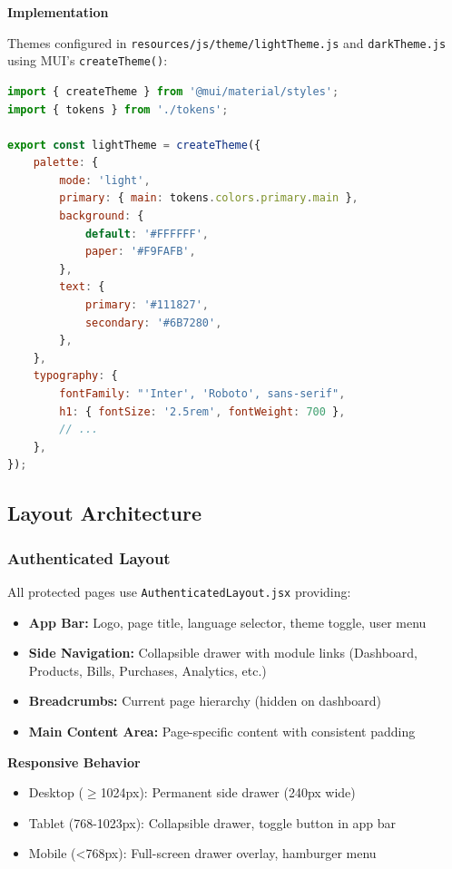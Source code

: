 \textbf{Implementation}

Themes configured in \texttt{resources/js/theme/lightTheme.js} and \texttt{darkTheme.js} using MUI's \texttt{createTheme()}:

\begin{lstlisting}[language=JavaScript,label=lst:theme-config]
import { createTheme } from '@mui/material/styles';
import { tokens } from './tokens';

export const lightTheme = createTheme({
    palette: {
        mode: 'light',
        primary: { main: tokens.colors.primary.main },
        background: {
            default: '#FFFFFF',
            paper: '#F9FAFB',
        },
        text: {
            primary: '#111827',
            secondary: '#6B7280',
        },
    },
    typography: {
        fontFamily: "'Inter', 'Roboto', sans-serif",
        h1: { fontSize: '2.5rem', fontWeight: 700 },
        // ...
    },
});
\end{lstlisting}

\subsection{Layout Architecture}

\subsubsection{Authenticated Layout}

All protected pages use \texttt{AuthenticatedLayout.jsx} providing:

\begin{itemize}
    \item \textbf{App Bar:} Logo, page title, language selector, theme toggle, user menu
    \item \textbf{Side Navigation:} Collapsible drawer with module links (Dashboard, Products, Bills, Purchases, Analytics, etc.)
    \item \textbf{Breadcrumbs:} Current page hierarchy (hidden on dashboard)
    \item \textbf{Main Content Area:} Page-specific content with consistent padding
\end{itemize}

\textbf{Responsive Behavior}

\begin{itemize}
    \item Desktop ($\geq$1024px): Permanent side drawer (240px wide)
    \item Tablet (768-1023px): Collapsible drawer, toggle button in app bar
    \item Mobile (<768px): Full-screen drawer overlay, hamburger menu
\end{itemize}

